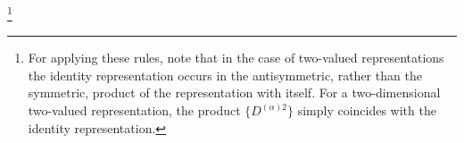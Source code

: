 \footnote{For applying these rules, note that in the case of two-valued representations the identity representation occurs in the antisymmetric, rather than the symmetric, product of the representation with itself. For a two-dimensional two-valued representation, the product $\{D^{(\alpha)2}\}$ simply coincides with the identity representation.}
